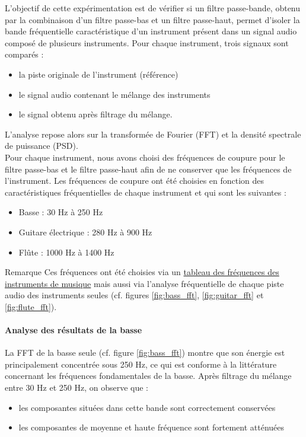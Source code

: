 L'objectif de cette expérimentation est de vérifier si un filtre passe-bande, obtenu par la combinaison d'un filtre passe-bas et un filtre passe-haut, permet d'isoler la bande fréquentielle caractéristique d'un instrument présent dans un signal audio composé de plusieurs instruments. Pour chaque instrument, trois signaux sont comparés :
\begin{itemize}
    \item la piste originale de l'instrument (référence)
    \item le signal audio contenant le mélange des instruments
    \item le signal obtenu après filtrage du mélange.
\end{itemize}

L'analyse repose alors sur la transformée de Fourier (FFT) et la densité spectrale de puissance (PSD). \\

Pour chaque instrument, nous avons choisi des fréquences de coupure pour le filtre passe-bas et le filtre passe-haut afin de ne conserver que les fréquences de l'instrument. Les fréquences de coupure ont été choisies en fonction des caractéristiques fréquentielles de chaque instrument et qui sont les suivantes :
\begin{itemize}
    \item Basse : 30 Hz à 250 Hz
    \item Guitare électrique : 280 Hz à 900 Hz
    \item Flûte : 1000 Hz à 1400 Hz
\end{itemize}

\RemarkBox
{Remarque}
{
Ces fréquences ont été choisies via un \href{https://www.studioenregistrement.fr/post/frequences-des-instruments-de-musique}{tableau des fréquences des instruments de musique} mais aussi via l'analyse fréquentielle de chaque piste audio des instruments seules (cf. figures \ref{fig:bass_fft}, \ref{fig:guitar_fft} et \ref{fig:flute_fft}). 
}

\paragraph{Analyse des résultats de la basse}

La FFT de la basse seule (cf. figure \ref{fig:bass_fft}) montre que son énergie est principalement concentrée sous 250 Hz, ce qui est conforme à la littérature concernant les fréquences fondamentales de la basse. Après filtrage du mélange entre 30 Hz et 250 Hz, on observe que :
\begin{itemize}
    \item les composantes situées dans cette bande sont correctement conservées
    \item les composantes de moyenne et haute fréquence sont fortement atténuées
\end{itemize}

